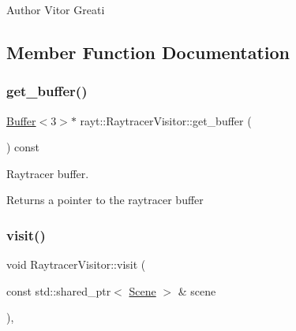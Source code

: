\begin{DoxyAuthor}{Author}
Vitor Greati 
\end{DoxyAuthor}


\subsection{Member Function Documentation}
\mbox{\label{classrayt_1_1_raytracer_visitor_aecfbe163d3bf3ba0e88ab64d6abdec60}} 
\subsubsection{\texorpdfstring{get\_buffer()}{get\_buffer()}}
{\footnotesize\ttfamily \mbox{\hyperlink{classrayt_1_1_buffer}{Buffer}}$<$3$>$$\ast$ rayt\+::\+Raytracer\+Visitor\+::get\+\_\+buffer (\begin{DoxyParamCaption}{ }\end{DoxyParamCaption}) const\hspace{0.3cm}{\ttfamily [inline]}}



Raytracer buffer. 

\begin{DoxyReturn}{Returns}
a pointer to the raytracer buffer 
\end{DoxyReturn}
\mbox{\label{classrayt_1_1_raytracer_visitor_ac469c21e8ac5e9a01ca6a58108bc860e}} 
\subsubsection{\texorpdfstring{visit()}{visit()}}
{\footnotesize\ttfamily void Raytracer\+Visitor\+::visit (\begin{DoxyParamCaption}\item[{const std\+::shared\+\_\+ptr$<$ \mbox{\hyperlink{classrayt_1_1_scene}{Scene}} $>$ \&}]{scene }\end{DoxyParamCaption})\hspace{0.3cm}{\ttfamily [override]}, {\ttfamily [virtual]}}



